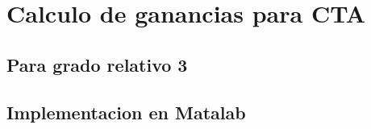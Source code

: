 \chapter{Calculo de ganancias para CTA} \label{Cap4}
\section{Para grado relativo 3}
\section{Implementacion en Matalab}




	
